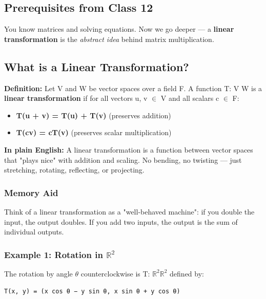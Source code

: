 \documentclass[12pt,a4paper,openany]{book}
\begin{document}
{{\subsection{Prerequisites from Class 12}
You know matrices and solving equations. Now we go deeper — a \textbf{linear transformation} is the \textit{abstract idea} behind matrix multiplication.

\subsection{What is a Linear Transformation?}

\begin{tcolorbox}[colback=lightblue!30,colframe=defgreen,title=\textbf{Definition},breakable,boxrule=1.5pt]
\textbf{Definition:} Let V and W be vector spaces over a field F. A function T: V  W is a \textbf{linear transformation} if for all vectors u, v $\in$ V and all scalars c $\in$ F:
\end{tcolorbox}

\begin{itemize}
  \item \textbf{T(u + v) = T(u) + T(v)} (preserves addition)
  \item \textbf{T(cv) = cT(v)} (preserves scalar multiplication)
\end{itemize}

\textbf{In plain English:} A linear transformation is a function between vector spaces that "plays nice" with addition and scaling. No bending, no twisting — just stretching, rotating, reflecting, or projecting.

\subsubsection{ Memory Aid}
Think of a linear transformation as a "well-behaved machine": if you double the input, the output doubles. If you add two inputs, the output is the sum of individual outputs.

\subsubsection{Example 1: Rotation in $\mathbb{R}^2$}
The rotation by angle $\theta$ counterclockwise is T: $\mathbb{R}^2\mathbb{R}^2$ defined by:

\begin{verbatim}
T(x, y) = (x cos θ − y sin θ, x sin θ + y cos θ)
\end{verbatim}

}}
\end{document}
